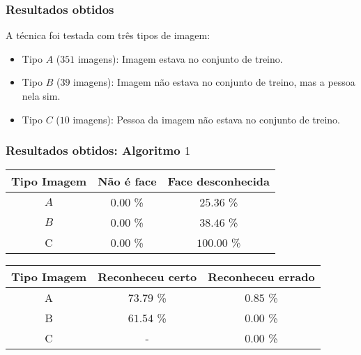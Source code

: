 \documentclass[15pt]{beamer}
\begin{document}
\begin{frame}
    \frametitle{Resultados obtidos}

    A técnica foi testada com três tipos de imagem:
    \begin{itemize}
        \item Tipo \( A \) (\( 351 \) imagens): Imagem estava no conjunto de treino.
        \item Tipo \( B \) (\( 39 \) imagens): Imagem não estava no conjunto de treino, mas a pessoa nela sim.
        \item Tipo \( C \) (\( 10 \) imagens): Pessoa da imagem não estava no conjunto de treino.

    \end{itemize}
\end{frame}

\begin{frame}
    \frametitle{Resultados obtidos: Algoritmo \( 1 \)}
    \begin{table}
        \begin{tabular}{ |c|c|c| }
            \hline
            Tipo Imagem & Não é face & Face desconhecida \\
            \hline
            \( A \) & \( 0.00 \) \% & \( 25.36 \) \% \\
            \hline
            \( B \) & \( 0.00 \) \% & \( 38.46 \) \% \\
            \hline
            C & \( 0.00 \) \% & \( 100.00 \) \% \\
            \hline
        \end{tabular}
    \end{table}

    \begin{table}
        \begin{tabular}{|c|c|c|}
            \hline
            Tipo Imagem & Reconheceu certo & Reconheceu errado \\
            \hline
            A & \( 73.79 \) \% & \( 0.85 \) \% \\
            \hline
            B & \( 61.54 \) \% & \( 0.00 \) \% \\
            \hline
            C & - & \( 0.00 \) \% \\
            \hline
        \end{tabular}
    \end{table}
\end{frame}
\end{document}
